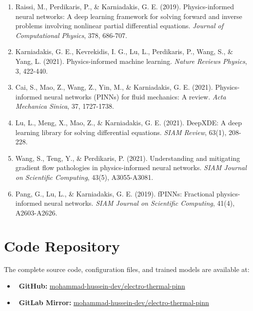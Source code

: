 \documentclass[11pt,a4paper]{article}
\begin{document}
\begin{enumerate}
    \item Raissi, M., Perdikaris, P., \& Karniadakis, G. E. (2019). Physics-informed neural networks: A deep learning framework for solving forward and inverse problems involving nonlinear partial differential equations. \textit{Journal of Computational Physics}, 378, 686-707.

    \item Karniadakis, G. E., Kevrekidis, I. G., Lu, L., Perdikaris, P., Wang, S., \& Yang, L. (2021). Physics-informed machine learning. \textit{Nature Reviews Physics}, 3, 422-440.

    \item Cai, S., Mao, Z., Wang, Z., Yin, M., \& Karniadakis, G. E. (2021). Physics-informed neural networks (PINNs) for fluid mechanics: A review. \textit{Acta Mechanica Sinica}, 37, 1727-1738.

    \item Lu, L., Meng, X., Mao, Z., \& Karniadakis, G. E. (2021). DeepXDE: A deep learning library for solving differential equations. \textit{SIAM Review}, 63(1), 208-228.

    \item Wang, S., Teng, Y., \& Perdikaris, P. (2021). Understanding and mitigating gradient flow pathologies in physics-informed neural networks. \textit{SIAM Journal on Scientific Computing}, 43(5), A3055-A3081.

    \item Pang, G., Lu, L., \& Karniadakis, G. E. (2019). fPINNs: Fractional physics-informed neural networks. \textit{SIAM Journal on Scientific Computing}, 41(4), A2603-A2626.
\end{enumerate}

\appendix
\section{Code Repository}

The complete source code, configuration files, and trained models are available at:

\begin{itemize}
    \item {}~\textbf{GitHub:} \href{https://github.com/mohammad-hussein-dev/electro-thermal-pinn}{mohammad-hussein-dev/electro-thermal-pinn}
    \item {}~\textbf{GitLab Mirror:} \href{https://gitlab.com/mohammad-hussein-dev/electro-thermal-pinn}{mohammad-hussein-dev/electro-thermal-pinn}
\end{itemize}
\end{document}
